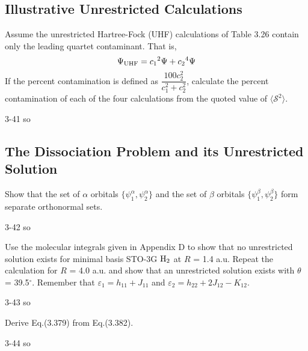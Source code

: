 \documentclass[a4paper]{book}
\begin{document}
	\subsection{Illustrative Unrestricted Calculations}
	
	\begin{exercise}
	Assume the unrestricted Hartree-Fock (UHF) calculations of Table 3.26 contain only the leading quartet contaminant. That is,
	\[
	 	\Psi_{\rm UHF} = c_1 {}^{2} \Psi + c_2 {}^{4} \Psi 
	\]
	If the percent contamination is defined as $\dfrac{ 100 c^2_2 }{ c^2_1 + c^2_2 }$, calculate the percent contamination of each of the four calculations from the quoted value of $\langle \mathscr{S}^2 \rangle$.
	\end{exercise}
	
	\begin{solution}
		3-41 so
	\end{solution}
	
	\subsection{The Dissociation Problem and its Unrestricted Solution}
	
	\begin{exercise}
	Show that the set of $\alpha$ orbitals $\{ \psi^\alpha_1 , \psi^\alpha_2 \}$ and the set of $\beta$ orbitals $\{ \psi^\beta_1 , \psi^\beta_2 \}$ form separate orthonormal sets.
	\end{exercise}
	
	\begin{solution}
		3-42 so
	\end{solution}
	
	\begin{exercise}
	Use the molecular integrals given in Appendix D to show that no unrestricted solution exists for minimal basis STO-3G $\ce{H2}$ at $R$ = 1.4 a.u. Repeat the calculation for $R$ = 4.0 a.u. and show that an unrestricted solution exists with $\theta$ = 39.5${}^\circ$. Remember that $\varepsilon_1 = h_{11} + J_{11}$ and $\varepsilon_2 = h_{22} + 2 J_{12} - K_{12}$.
	\end{exercise}
	
	\begin{solution}
		3-43 so
	\end{solution}
	
	\begin{exercise}
	Derive Eq.(3.379) from Eq.(3.382).
	\end{exercise}
	
	\begin{solution}
		3-44 so
	\end{solution}
\end{document}
